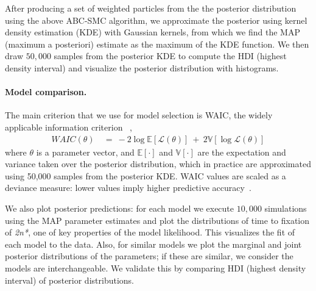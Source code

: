 \documentclass[12pt]{extarticle}
\newcommand{\likelihood}{\mathcal{L}}
\newcommand{\eumt}{\emph{2n*}}
\begin{document}
After producing a set of weighted particles from the the posterior distribution using the above ABC-SMC algorithm, we approximate the posterior using kernel density estimation (KDE) with Gaussian kernels, from which we find the MAP (maximum a posteriori) estimate as the maximum of the KDE function. We then draw $50,000$ samples from the posterior KDE to compute the HDI (highest density interval) and visualize the posterior distribution with histograms.


\paragraph{Model comparison.} The main criterion that we use for model selection is WAIC, the widely applicable information criterion ~\citep{gelman2013bayesian},
\begin{equation} \label{eq:WAIC}
\begin{aligned}
\mathit{WAIC}(\theta) &\ =\ 
-2\log\mathbb{E}[\likelihood(\theta)]\ +\ 2\mathbb{V}[\log\likelihood(\theta)]
\end{aligned}
\end{equation}
where $\theta$ is a parameter vector, and $\mathbb{E}[\cdot]$ and $\mathbb{V}[\cdot]$ are the expectation and variance taken over the posterior distribution, which in practice are approximated using 50,000 samples from the posterior KDE.
WAIC values are scaled as a deviance measure: lower values imply higher predictive accuracy~\citep{Kass1995}.

We also plot posterior predictions: for each model we execute $10,000$ simulations using the MAP parameter estimates and plot the distributions of time to fixation of \eumt, one of key properties of the model likelihood. This visualizes the fit of each model to the data. 
Also, for similar models we plot the marginal and joint posterior distributions of the parameters; if these are similar, we consider the models are interchangeable. We validate this by comparing HDI (highest density interval) of posterior distributions.
 
\end{document}

